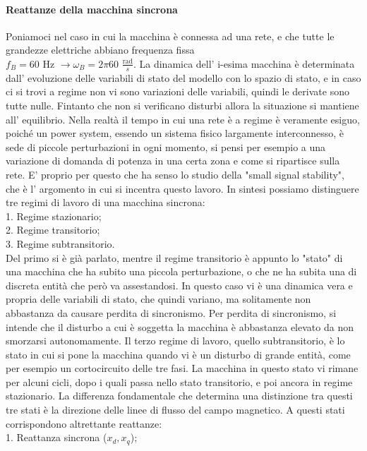 \documentclass[Lau,noexaminfo]{sapthesis}
\begin{document}
	\paragraph{Reattanze della macchina sincrona}
	Poniamoci nel caso in cui la macchina è connessa ad una rete, e che tutte le grandezze elettriche abbiano frequenza fissa \\$f_B=60$ Hz $\rightarrow \omega_B=2\pi60$ $\frac{\text{rad}}{s}$. La dinamica dell' i-esima macchina è determinata dall' evoluzione delle variabili di stato del modello con lo spazio di stato, e in caso ci si trovi a regime non vi sono variazioni delle variabili, quindi le derivate sono tutte nulle. Fintanto che non si verificano disturbi allora la situazione si mantiene all' equilibrio. Nella realtà il tempo in cui una rete è a regime è veramente esiguo, poiché un power system, essendo un sistema fisico largamente interconnesso, è sede di piccole perturbazioni in ogni momento, si pensi per esempio a una variazione di domanda di potenza in una certa zona e come si ripartisce sulla rete. E' proprio per questo che ha senso lo studio della "small signal stability", che è l' argomento in cui si incentra questo lavoro. In sintesi possiamo distinguere tre regimi di lavoro di una macchina sincrona:\\
	1. Regime stazionario;\\
	2. Regime transitorio;\\
	3. Regime subtransitorio.\\
	Del primo si è già parlato, mentre il regime transitorio è appunto lo "stato" di una macchina che ha subito una piccola perturbazione, o che ne ha subita una di discreta entità che però va assestandosi. In questo caso vi è una dinamica vera e propria delle variabili di stato, che quindi variano, ma solitamente non abbastanza da causare perdita di sincronismo. Per perdita di sincronismo, si intende che il disturbo a cui è soggetta la macchina è abbastanza elevato da non smorzarsi autonomamente. Il terzo regime di lavoro, quello subtransitorio, è lo stato in cui si pone la macchina quando vi è un disturbo di grande entità, come per esempio un cortocircuito delle tre fasi. La macchina in questo stato vi rimane per alcuni cicli, dopo i quali passa nello stato transitorio, e poi ancora in regime stazionario. La differenza fondamentale che determina una distinzione tra questi tre stati è la direzione delle linee di flusso del campo magnetico. A questi stati corrispondono altrettante reattanze:\\
	1. Reattanza sincrona ($x_d, x_q$);\\
\end{document}
